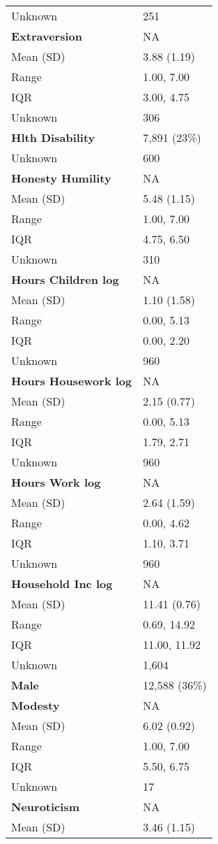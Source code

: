 \documentclass[
  single column]{article}
\begin{document}
\begin{longtable}[]{@{}ll@{}}
Unknown & 251 \\
\textbf{Extraversion} & NA \\
Mean (SD) & 3.88 (1.19) \\
Range & 1.00, 7.00 \\
IQR & 3.00, 4.75 \\
Unknown & 306 \\
\textbf{Hlth Disability} & 7,891 (23\%) \\
Unknown & 600 \\
\textbf{Honesty Humility} & NA \\
Mean (SD) & 5.48 (1.15) \\
Range & 1.00, 7.00 \\
IQR & 4.75, 6.50 \\
Unknown & 310 \\
\textbf{Hours Children log} & NA \\
Mean (SD) & 1.10 (1.58) \\
Range & 0.00, 5.13 \\
IQR & 0.00, 2.20 \\
Unknown & 960 \\
\textbf{Hours Housework log} & NA \\
Mean (SD) & 2.15 (0.77) \\
Range & 0.00, 5.13 \\
IQR & 1.79, 2.71 \\
Unknown & 960 \\
\textbf{Hours Work log} & NA \\
Mean (SD) & 2.64 (1.59) \\
Range & 0.00, 4.62 \\
IQR & 1.10, 3.71 \\
Unknown & 960 \\
\textbf{Household Inc log} & NA \\
Mean (SD) & 11.41 (0.76) \\
Range & 0.69, 14.92 \\
IQR & 11.00, 11.92 \\
Unknown & 1,604 \\
\textbf{Male} & 12,588 (36\%) \\
\textbf{Modesty} & NA \\
Mean (SD) & 6.02 (0.92) \\
Range & 1.00, 7.00 \\
IQR & 5.50, 6.75 \\
Unknown & 17 \\
\textbf{Neuroticism} & NA \\
Mean (SD) & 3.46 (1.15) \\

\end{longtable}
\end{document}
